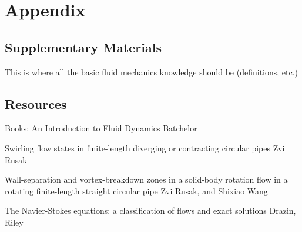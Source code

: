 \documentclass{X:/Documents/Coding/Latex/myreport}
\begin{document}


\clearpage
\section{Appendix}
\subsection{Supplementary Materials}
This is where all the basic fluid mechanics knowledge should be (definitions, etc.)

\subsection{Resources}
Books:
An Introduction to Fluid Dynamics
Batchelor

Swirling flow states in finite-length diverging or contracting circular pipes
Zvi Rusak


Wall-separation and vortex-breakdown zones in a solid-body rotation flow in a rotating finite-length straight circular pipe
Zvi Rusak, and Shixiao Wang

The Navier-Stokes equations: a classification of flows and exact solutions
Drazin, Riley


\end{document}
